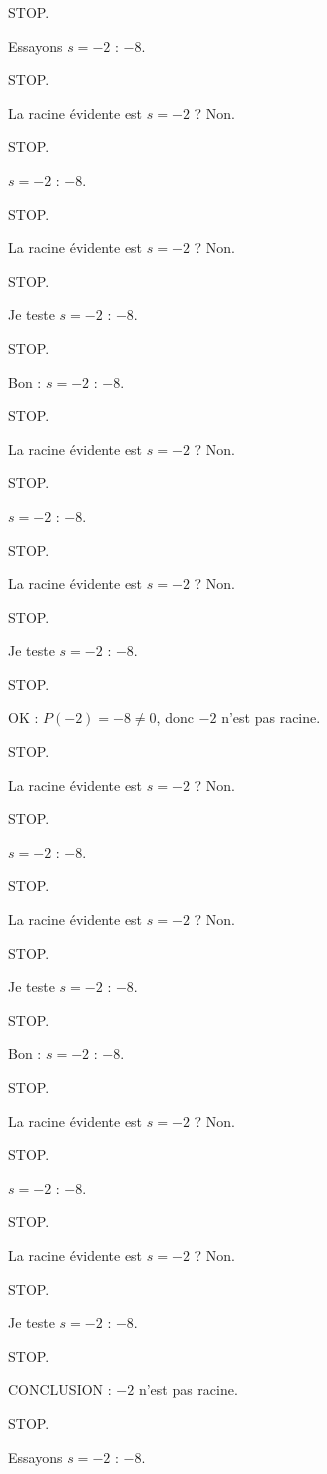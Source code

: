 \documentclass[11pt]{article}
\begin{document}
\begin{exoresolu}
\begin{enumerate}
STOP. 

Essayons $s = -2$ : $-8$. 

STOP. 

La racine évidente est $s = -2$ ? Non. 

STOP. 

$s = -2$ : $-8$. 

STOP. 

La racine évidente est $s = -2$ ? Non. 

STOP. 

Je teste $s = -2$ : $-8$. 

STOP. 

Bon : $s = -2$ : $-8$. 

STOP. 

La racine évidente est $s = -2$ ? Non. 

STOP. 

$s = -2$ : $-8$. 

STOP. 

La racine évidente est $s = -2$ ? Non. 

STOP. 

Je teste $s = -2$ : $-8$. 

STOP. 

OK : $P(-2) = -8 \neq 0$, donc $-2$ n'est pas racine. 

STOP. 

La racine évidente est $s = -2$ ? Non. 

STOP. 

$s = -2$ : $-8$. 

STOP. 

La racine évidente est $s = -2$ ? Non. 

STOP. 

Je teste $s = -2$ : $-8$. 

STOP. 

Bon : $s = -2$ : $-8$. 

STOP. 

La racine évidente est $s = -2$ ? Non. 

STOP. 

$s = -2$ : $-8$. 

STOP. 

La racine évidente est $s = -2$ ? Non. 

STOP. 

Je teste $s = -2$ : $-8$. 

STOP. 

CONCLUSION : $-2$ n'est pas racine. 

STOP. 

Essayons $s = -2$ : $-8$. 


\end{enumerate}
\end{exoresolu}
\end{document}
